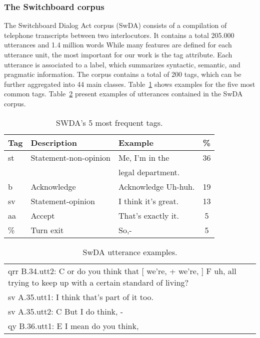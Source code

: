 \subsubsection*{The Switchboard corpus}
The Switchboard Dialog Act corpus (SwDA) consists of a compilation of telephone transcripts between two interlocutors. It contains a total 205.000 utterances and 1.4 million words
While many features are defined for each utterance unit, the most important for our work is the tag attribute. Each utterance is associated to a label, which summarizes syntactic, semantic, and pragmatic information. The corpus contains a total of 200 tags, which can be further aggregated into 44 main classes. Table~\ref{tab:swda_tag_example} shows examples for the five most common tags. Table~\ref{tab:swda_sent_example} present examples of utterances contained in the SwDA corpus.


\begin{table}[h]
\centering
\begin{tabular}{l l l c}
\hline
\textbf{Tag} & \textbf{Description} & \textbf{Example} & \textbf{\%}\\
\hline
st & Statement-non-opinion & Me, I'm in the & 36 \\
 & & legal department. & \\
b & Acknowledge & Acknowledge Uh-huh. & 19 \\
sv & Statement-opinion & I think it's great. & 13 \\
aa & Accept & That's exactly it. & 5 \\
\% & Turn exit & So,- & 5 \\
 \hline
\end{tabular}
\caption{SWDA's 5 most frequent tags.}
\label{tab:swda_tag_example}
\end{table}

\begin{table}[h]
\centering
\begin{tabular}{p{}}
\hline
qrr B.34.utt2: {C or } do you think that [ we're, + we're, ] {F uh, } all trying to keep up with a certain standard of living? \\
sv A.35.utt1: I think that's part of it too. \\
sv A.35.utt2: {C But } I do think, - \\
qy B.36.utt1: {E I mean } do you think, \\
\hline
\end{tabular}
\caption{SwDA utterance examples.}
\label{tab:swda_sent_example}
\end{table}

